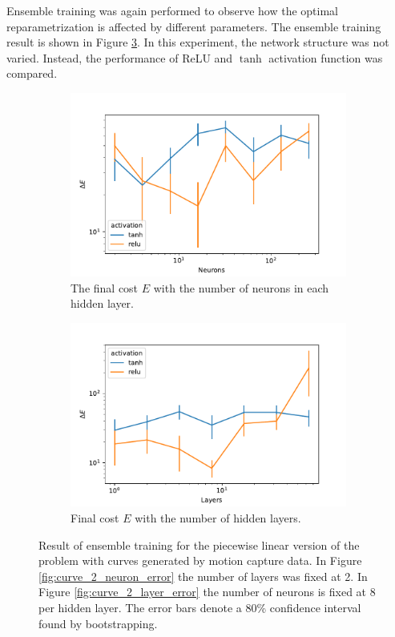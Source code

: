 Ensemble training was again performed to observe how the optimal reparametrization is affected by different parameters. The ensemble training result is shown in Figure \ref{fig:curve_so3_pl_eks}. In this experiment, the network structure was not varied. Instead, the performance of ReLU and \(\tanh\) activation function was compared.

\begin{figure}[t]
    \begin{subfigure}[t]{0.5\textwidth}
        \centering
        \includegraphics[width=\linewidth]{figures/curve_so3/pl_eks_6/neurons_error.pdf}
        \caption{The final cost \(E\) with the number of neurons in each hidden layer.}\label{fig:curve_so3_pl_neuron_error}
    \end{subfigure}
    \begin{subfigure}[t]{0.5\textwidth}
        \centering
        \includegraphics[width=\linewidth]{figures/curve_so3/pl_eks_6/layer_error.pdf}
        \caption{Final cost \(E\) with the number of hidden layers.}\label{fig:curve_so3_pl_layer_error}
    \end{subfigure}
    \caption{Result of ensemble training for the piecewise linear version of the problem with curves generated by motion capture data. In Figure \ref{fig:curve_2_neuron_error} the number of layers was fixed at 2. In Figure \ref{fig:curve_2_layer_error} the number of neurons is fixed at 8 per hidden layer. The error bars denote a 80\% confidence interval found by bootstrapping.}\label{fig:curve_so3_pl_eks}
\end{figure}

